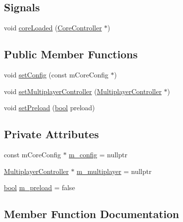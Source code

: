 \subsection*{Signals}
\begin{DoxyCompactItemize}
\item 
void \mbox{\hyperlink{class_q_g_b_a_1_1_core_manager_a09f8e6bf8380c7f4eb746863be3396d8}{core\+Loaded}} (\mbox{\hyperlink{class_q_g_b_a_1_1_core_controller}{Core\+Controller}} $\ast$)
\end{DoxyCompactItemize}
\subsection*{Public Member Functions}
\begin{DoxyCompactItemize}
\item 
void \mbox{\hyperlink{class_q_g_b_a_1_1_core_manager_a2f071a4362e674aa29f19dd7e22fe433}{set\+Config}} (const m\+Core\+Config $\ast$)
\item 
void \mbox{\hyperlink{class_q_g_b_a_1_1_core_manager_a3f60ebb15fa19bacc1e441b7c9447cf7}{set\+Multiplayer\+Controller}} (\mbox{\hyperlink{class_q_g_b_a_1_1_multiplayer_controller}{Multiplayer\+Controller}} $\ast$)
\item 
void \mbox{\hyperlink{class_q_g_b_a_1_1_core_manager_a13e52a9e469da842073a50ddc9654476}{set\+Preload}} (\mbox{\hyperlink{libretro_8h_a4a26dcae73fb7e1528214a068aca317e}{bool}} preload)
\end{DoxyCompactItemize}
\subsection*{Private Attributes}
\begin{DoxyCompactItemize}
\item 
const m\+Core\+Config $\ast$ \mbox{\hyperlink{class_q_g_b_a_1_1_core_manager_a03be1cec0f33e56086a2891cfc7944a3}{m\+\_\+config}} = nullptr
\item 
\mbox{\hyperlink{class_q_g_b_a_1_1_multiplayer_controller}{Multiplayer\+Controller}} $\ast$ \mbox{\hyperlink{class_q_g_b_a_1_1_core_manager_a73078dc59bc485fcfd945bf4a3b52c77}{m\+\_\+multiplayer}} = nullptr
\item 
\mbox{\hyperlink{libretro_8h_a4a26dcae73fb7e1528214a068aca317e}{bool}} \mbox{\hyperlink{class_q_g_b_a_1_1_core_manager_ac7e2bf905870fd80d6ac70029cb44a67}{m\+\_\+preload}} = false
\end{DoxyCompactItemize}


\subsection{Member Function Documentation}
\mbox{\label{class_q_g_b_a_1_1_core_manager_a09f8e6bf8380c7f4eb746863be3396d8}} 
